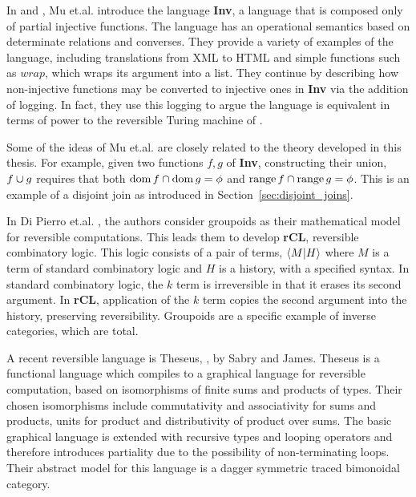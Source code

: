 In \cite{mu06bidirectional} and \cite{muetal04:injreversible}, Mu et.al. introduce the language
\textbf{Inv}, a language that is composed only of partial injective functions. The language has an
operational semantics based on determinate relations and converses. They provide a variety of examples of the
language, including translations from XML to HTML and simple functions such as $wrap$, which wraps
its argument into a list. They continue by describing how non-injective functions may be converted to
injective ones in \textbf{Inv} via the addition of logging. In fact, they use this logging to argue
the language is equivalent in terms of power to the reversible Turing machine of
\cite{bennett:1973reverse}.

Some of the ideas of Mu et.al. are closely related to the theory developed in this thesis. For
example,  given two functions $f,g$ of \textbf{Inv}, constructing their union, $f\cup g$ requires
that both $\operatorname*{dom} f \cap \operatorname*{dom} g = \phi$ and $\operatorname*{range} f \cap \operatorname*{range} g =
\phi$. This is an example of a disjoint join as introduced in Section~\ref{sec:disjoint_joins}.

In Di Pierro et.al. \cite{DiPierro200625}, the authors consider groupoids as their mathematical
model for reversible computations. This leads them to develop \textbf{rCL}, reversible combinatory
logic. This logic consists of a pair of terms, $\langle M|H\rangle$ where $M$ is a term of standard combinatory
logic and $H$ is a history, with a specified syntax. In standard combinatory logic, the $k$ term is
irreversible in that it erases its second argument. In \textbf{rCL}, application of the $k$ term
copies the second argument into the history, preserving reversibility. Groupoids are a specific
example of inverse categories, which are total.

A recent reversible language is Theseus, \cite{james2014theseus}, by Sabry and James. Theseus is a
functional language which compiles to a graphical language
\cite{james2013isomorphic,james2012information} for reversible computation, based on
isomorphisms of finite sums and products of types. Their chosen isomorphisms include commutativity
and associativity for sums and products, units for product and distributivity of product over
sums. The basic graphical language is extended with recursive types and looping operators and
therefore introduces partiality due to the possibility of non-terminating loops. Their abstract
model for this language is a dagger symmetric traced bimonoidal category\cite{selinger05:dagger}.

